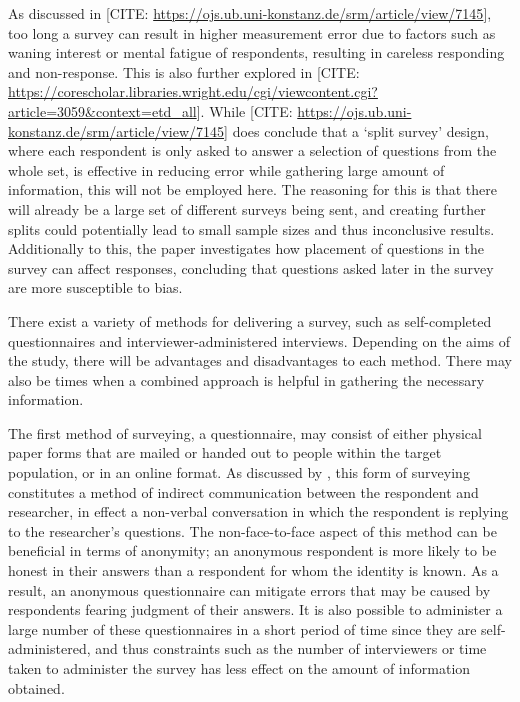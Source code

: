 \documentclass[
  12pt,
  twocolumn]{book}
\begin{document}
As discussed in {[}CITE:
\url{https://ojs.ub.uni-konstanz.de/srm/article/view/7145}{]}, too long
a survey can result in higher measurement error due to factors such as
waning interest or mental fatigue of respondents, resulting in careless
responding and non-response. This is also further explored in {[}CITE:
\url{https://corescholar.libraries.wright.edu/cgi/viewcontent.cgi?article=3059\&context=etd_all}{]}.
While {[}CITE:
\url{https://ojs.ub.uni-konstanz.de/srm/article/view/7145}{]} does
conclude that a `split survey' design, where each respondent is only
asked to answer a selection of questions from the whole set, is
effective in reducing error while gathering large amount of information,
this will not be employed here. The reasoning for this is that there
will already be a large set of different surveys being sent, and
creating further splits could potentially lead to small sample sizes and
thus inconclusive results. Additionally to this, the paper investigates
how placement of questions in the survey can affect responses,
concluding that questions asked later in the survey are more susceptible
to bias.

There exist a variety of methods for delivering a survey, such as
self-completed questionnaires and interviewer-administered interviews.
Depending on the aims of the study, there will be advantages and
disadvantages to each method. There may also be times when a combined
approach is helpful in gathering the necessary information.

The first method of surveying, a questionnaire, may consist of either
physical paper forms that are mailed or handed out to people within the
target population, or in an online format. As discussed by
\citet{brace2004}, this form of surveying constitutes a method of
indirect communication between the respondent and researcher, in effect
a non-verbal conversation in which the respondent is replying to the
researcher's questions. The non-face-to-face aspect of this method can
be beneficial in terms of anonymity; an anonymous respondent is more
likely to be honest in their answers than a respondent for whom the
identity is known. As a result, an anonymous questionnaire can mitigate
errors that may be caused by respondents fearing judgment of their
answers. It is also possible to administer a large number of these
questionnaires in a short period of time since they are
self-administered, and thus constraints such as the number of
interviewers or time taken to administer the survey has less effect on
the amount of information obtained.
\end{document}
